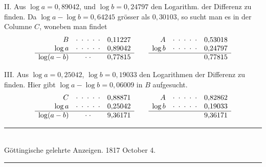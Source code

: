II. Aus $\log a=0{,}89042$, und $\log b=0{,}24797$ den Logarithm. der Differenz zu finden. Da $\log a-\log b=0{,}64245$ grösser als $0{,}30103$, so sucht
man es in der Columne $C$, woneben man findet
\[
\begin{array}{rcr}
B&\cdot\;\cdot\;\cdot\;\cdot\;\cdot&0{,}11227\\
\log a&\cdot\;\cdot\;\cdot\;\cdot\;\cdot&0{,}89042\\\hline
\log(a-b)&\cdot\;\cdot&0{,}77815
\end{array}
\qquad
\begin{array}{rcr}
A&\cdot\;\cdot\;\cdot\;\cdot\;\cdot&0{,}53018\\
\log b&\cdot\;\cdot\;\cdot\;\cdot\;\cdot&0{,}24797\\\hline
&&0{,}77815
\end{array}
\]

III. Aus $\log a=0{,}25042$, $\log b=0{,}19033$ den Logarithmen der Differenz zu finden. Hier gibt $\log a-\log b=0{,}06009$ in $B$ aufgesucht.
\[
\begin{array}{rcr}
C&\cdot\;\cdot\;\cdot\;\cdot\;\cdot&0{,}88871\\
\log a&\cdot\;\cdot\;\cdot\;\cdot\;\cdot&0{,}25042\\\hline
\log(a-b)&\cdot\;\cdot&9{,}36171
\end{array}
\qquad
\begin{array}{rcr}
A&\cdot\;\cdot\;\cdot\;\cdot\;\cdot&0{,}82862\\
\log b&\cdot\;\cdot\;\cdot\;\cdot\;\cdot&0{,}19033\\\hline
&&9{,}36171
\end{array}
\]

\par{}
\begin{center}
\rule{0.65\linewidth}{0.4pt}\\
Göttingische gelehrte Anzeigen. 1817 October 4.\\
\rule{0.65\linewidth}{0.4pt}
\end{center}

